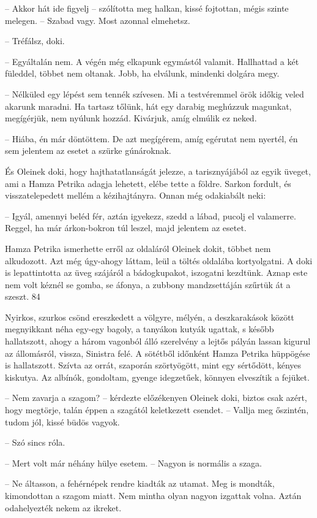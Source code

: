 \documentclass{IEEEtran}
\begin{document}
– Akkor hát ide figyelj – szólította meg halkan, kissé fojtottan, mégis szinte
melegen. – Szabad vagy. Most azonnal elmehetsz.

– Tréfálsz, doki.

– Egyáltalán nem. A végén még elkapunk egymástól valamit. Hallhattad a két
füleddel, többet nem oltanak. Jobb, ha elválunk, mindenki dolgára megy.

– Nélküled egy lépést sem tennék szívesen. Mi a testvéremmel örök időkig veled
akarunk maradni. Ha tartasz tőlünk, hát egy darabig meghúzzuk magunkat,
megígérjük, nem nyúlunk hozzád. Kivárjuk, amíg elmúlik ez neked.

– Hiába, én már döntöttem. De azt megígérem, amíg egérutat nem nyertél, én sem
jelentem az esetet a szürke gúnároknak.

És Oleinek doki, hogy hajthatatlanságát jelezze, a tarisznyájából az egyik
üveget, ami a Hamza Petrika adagja lehetett, elébe tette a földre. Sarkon
fordult, és visszatelepedett mellém a kézihajtányra. Onnan még odakiabált
neki:

– Igyál, amennyi beléd fér, aztán igyekezz, szedd a lábad, pucolj el
valamerre. Reggel, ha már árkon-bokron túl leszel, majd jelentem az esetet.

Hamza Petrika ismerhette erről az oldaláról Oleinek dokit, többet nem
alkudozott. Azt még úgy-ahogy láttam, leül a töltés oldalába kortyolgatni. A
doki is lepattintotta az üveg szájáról a bádogkupakot, iszogatni kezdtünk.
Aznap este nem volt kéznél se gomba, se áfonya, a zubbony mandzsettáján
szűrtük át a szeszt.
84

Nyirkos, szurkos csönd ereszkedett a völgyre, mélyén, a deszkarakások között
megnyikkant néha egy-egy bagoly, a tanyákon kutyák ugattak, s később
hallatszott, ahogy a három vagonból álló szerelvény a lejtős pályán lassan
kigurul az állomásról, vissza, Sinistra felé. A sötétből időnként Hamza
Petrika hüppögése is hallatszott. Szívta az orrát, szaporán szörtyögött, mint
egy sértődött, kényes kiskutya. Az albínók, gondoltam, gyenge idegzetűek,
könnyen elveszítik a fejüket.

– Nem zavarja a szagom? – kérdezte előzékenyen Oleinek doki, biztos csak
azért, hogy megtörje, talán éppen a szagától keletkezett csendet. – Vallja meg
őszintén, tudom jól, kissé büdös vagyok.

– Szó sincs róla.

– Mert volt már néhány hülye esetem. – Nagyon is normális a szaga.

– Ne áltasson, a fehérnépek rendre kiadták az utamat. Meg is mondták,
kimondottan a szagom miatt. Nem mintha olyan nagyon izgattak volna. Aztán
odahelyezték nekem az ikreket.
\end{document}
